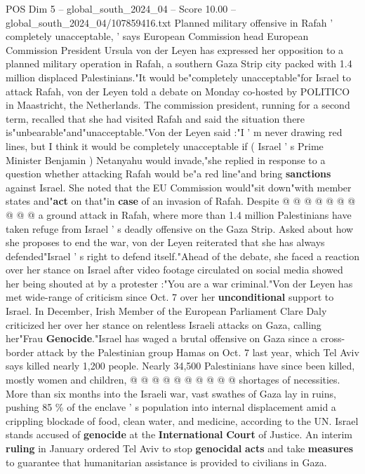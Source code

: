 \begin{textsample}{POS Dim 5 – global\_south\_2024\_04 – Score 10.00 – global\_south\_2024\_04/107859416.txt}  \label{ex:f5_pos_279}
Planned military offensive in Rafah ' completely unacceptable, ' says European Commission head European Commission President Ursula von der Leyen has expressed her opposition to a planned military operation in Rafah, a southern Gaza Strip city packed with 1.4 million displaced Palestinians."It would be"completely unacceptable"for Israel to attack Rafah, von der Leyen told a debate on Monday co-hosted by POLITICO in Maastricht, the Netherlands.
The commission president, running for a second term, recalled that she had visited Rafah and said the situation there is"unbearable"and"unacceptable."Von der Leyen said :"I ' m never drawing red lines, but I think it would be completely unacceptable if ( Israel ' s Prime Minister Benjamin ) Netanyahu would invade,"she replied in response to a question whether attacking Rafah would be"a red line"and bring \textbf{sanctions} against Israel.
She noted that the EU Commission would"sit down"with member states and"\textbf{act} on that"in \textbf{case} of an invasion of Rafah.
Despite @ @ @ @ @ @ @ @ @ @ a ground attack in Rafah, where more than 1.4 million Palestinians have taken refuge from Israel ' s deadly offensive on the Gaza Strip.
Asked about how she proposes to end the war, von der Leyen reiterated that she has always defended"Israel ' s right to defend itself."Ahead of the debate, she faced a reaction over her stance on Israel after video footage circulated on social media showed her being shouted at by a protester :"You are a war criminal."Von der Leyen has met wide-range of criticism since Oct. 7 over her \textbf{unconditional} support to Israel.
In December, Irish Member of the European Parliament Clare Daly criticized her over her stance on relentless Israeli attacks on Gaza, calling her"Frau \textbf{Genocide}."Israel has waged a brutal offensive on Gaza since a cross-border attack by the Palestinian group Hamas on Oct. 7 last year, which Tel Aviv says killed nearly 1,200 people.
Nearly 34,500 Palestinians have since been killed, mostly women and children, @ @ @ @ @ @ @ @ @ @ shortages of necessities.
More than six months into the Israeli war, vast swathes of Gaza lay in ruins, pushing 85 \% of the enclave ' s population into internal displacement amid a crippling blockade of food, clean water, and medicine, according to the UN.
Israel stands accused of \textbf{genocide} at the \textbf{International} \textbf{Court} of Justice.
An interim \textbf{ruling} in January ordered Tel Aviv to stop \textbf{genocidal} \textbf{acts} and take \textbf{measures} to guarantee that humanitarian assistance is provided to civilians in Gaza.

\end{textsample}
